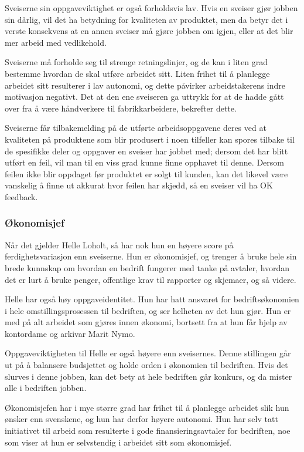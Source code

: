 Sveiserne sin oppgaveviktighet er også forholdsvis lav. Hvis en sveiser gjør jobben sin dårlig, vil det ha betydning for kvaliteten av produktet, men da betyr det i verste konsekvens at en annen sveiser må gjøre jobben om igjen, eller at det blir mer arbeid med vedlikehold.

Sveiserne må forholde seg til strenge retningslinjer, og de kan i liten grad bestemme hvordan de skal utføre arbeidet sitt. Liten frihet til å planlegge arbeidet sitt resulterer i lav autonomi, og dette påvirker arbeidstakerens indre motivasjon negativt. Det at den ene sveiseren ga uttrykk for at de hadde gått over fra å være håndverkere til fabrikkarbeidere, bekrefter dette.

Sveiserne får tilbakemelding på de utførte arbeidsoppgavene deres ved at kvaliteten på produktene som blir produsert i noen tilfeller kan spores tilbake til de spesifikke deler og oppgaver en sveiser har jobbet med; dersom det har blitt utført en feil, vil man til en viss grad kunne finne opphavet til denne. Dersom feilen ikke blir oppdaget før produktet er solgt til kunden, kan det likevel være vanskelig å finne ut akkurat hvor feilen har skjedd, så en sveiser vil ha OK feedback.

\subsubsection{Økonomisjef}
Når det gjelder Helle Loholt, så har nok hun en høyere score på ferdighetsvariasjon enn sveiserne. Hun er økonomisjef, og trenger å bruke hele sin brede kunnskap om hvordan en bedrift fungerer med tanke på avtaler, hvordan det er lurt å bruke penger, offentlige krav til rapporter og skjemaer, og så videre.

Helle har også høy oppgaveidentitet. Hun har hatt ansvaret for bedriftsøkonomien i hele omstillingsprosessen til bedriften, og ser helheten av det hun gjør. Hun er med på alt arbeidet som gjøres innen økonomi, bortsett fra at hun får hjelp av kontordame og arkivar Marit Nymo.

Oppgaveviktigheten til Helle er også høyere enn sveisernes. Denne stillingen går ut på å balansere budsjettet og holde orden i økonomien til bedriften. Hvis det slurves i denne jobben, kan det bety at hele bedriften går konkurs, og da mister alle i bedriften jobben.

Økonomisjefen har i mye større grad har frihet til å planlegge arbeidet slik hun ønsker enn svenskene, og hun har derfor høyere autonomi. Hun har selv tatt initiativet til arbeid som resulterte i gode finansieringsavtaler for bedriften, noe som viser at hun er selvstendig i arbeidet sitt som økonomisjef.

